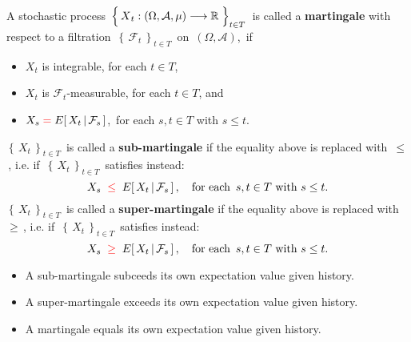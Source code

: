 
\begin{definition}
\mbox{}
\vskip 0.1cm
\noindent
A stochastic process
\,$\left\{\,\overset{{\color{white}.}}{X}_{t} : (\Omega,\mathcal{A},\mu) \longrightarrow \Re \;\right\}_{t \in T}$\,
is called a \textbf{martingale}
with respect to a filtration
\,$\left\{\,\mathcal{F}_{t}\,\right\}_{t \in T}$\, on \,$(\Omega,\mathcal{A})$,\,
if
\begin{itemize}
\item
	$X_{t}$ is integrable, for each $t \in T$,
\item
	$X_{t}$ is $\mathcal{F}_{t}$-measurable, for each $t \in T$, and
\item
	$X_{s} \; {\color{red}=} \; E\!\left[\,X_{t}\,\vert\,\mathcal{F}_{s}\,\right]$,\,
	for each $s, t \in T$ with $s \leq t$.
\end{itemize}
$\left\{\,X_{t}\,\right\}_{t \in T}$\, is called a \textbf{{\color{red}sub-}martingale}
if the equality above is replaced with \,{\color{red}$\leq$}\,,
i.e. if \,$\left\{\,X_{t}\,\right\}_{t \in T}$\, satisfies instead:
\begin{equation*}
X_{s} \;\; {\color{red}\leq} \;\; E\!\left[\,X_{t}\,\vert\,\mathcal{F}_{s}\,\right],
\quad
\textnormal{for each \,$s, t \in T$ with $s \leq t$}.
\end{equation*}
\vskip 0.1cm
\noindent
$\left\{\,X_{t}\,\right\}_{t \in T}$\, is called a \textbf{{\color{red}super-}martingale}
if the equality above is replaced with \,{\color{red}$\geq$}\,,
i.e. if \,$\left\{\,X_{t}\,\right\}_{t \in T}$\, satisfies instead:
\begin{equation*}
X_{s} \;\; {\color{red}\geq} \;\; E\!\left[\,X_{t}\,\vert\,\mathcal{F}_{s}\,\right],
\quad
\textnormal{for each \,$s, t \in T$ with $s \leq t$}.
\end{equation*}
\end{definition}


\begin{remark}
\mbox{}
\vskip -0.1cm
\noindent
\begin{itemize}
\item
	A {\color{red}sub-}martingale {\color{red}sub}ceeds its own expectation value given history.
\item
	A super-martingale exceeds its own expectation value given history.
\item
	A martingale equals its own expectation value given history.
\end{itemize}
\end{remark}

